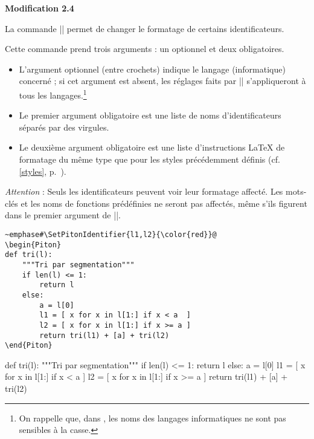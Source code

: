 \documentclass[dvipsnames,svgnames]{article}
\begin{document}
\colorbox{yellow!50}{\bfseries Modification 2.4}\par\nobreak

\smallskip
La commande |\SetPitonIdentifier| permet de changer le formatage de certains identificateurs.

\smallskip
Cette commande prend trois arguments : un optionnel et deux obligatoires.

\begin{itemize}
\item L'argument optionnel (entre crochets) indique le langage (informatique) concerné ; si cet
argument est absent, les réglages faits par |\SetPitonIdentifier| s'appliqueront à tous les langages.\footnote{On rappelle que, dans , les noms des langages informatiques ne sont pas
  sensibles à la casse.}

\item Le premier argument obligatoire est une liste de noms d'identificateurs séparés par des virgules.

\item Le deuxième argument obligatoire est une liste d'instructions LaTeX de formatage du même type que pour les
styles précédemment définis (cf. \ref{styles}, p.~\pageref{styles}).


\end{itemize}

\emph{Attention} : Seuls les identificateurs peuvent voir leur formatage affecté. Les mots-clés et les noms de
fonctions prédéfinies ne seront pas affectés, même s'ils figurent dans le premier argument de
|\SetPitonIdentifier|. 

\begin{Verbatim}
~emphase#\SetPitonIdentifier{l1,l2}{\color{red}}@
\begin{Piton}
def tri(l):
    """Tri par segmentation"""
    if len(l) <= 1:
        return l
    else:
        a = l[0]
        l1 = [ x for x in l[1:] if x < a  ]
        l2 = [ x for x in l[1:] if x >= a ]
        return tri(l1) + [a] + tri(l2)
\end{Piton}
\end{Verbatim}


\bigskip

\begingroup


\begin{Piton}
def tri(l):
    """Tri par segmentation"""
    if len(l) <= 1:
        return l
    else:
        a = l[0]
        l1 = [ x for x in l[1:] if x < a  ]
        l2 = [ x for x in l[1:] if x >= a ]
        return tri(l1) + [a] + tri(l2)
\end{Piton}
\end{document}
